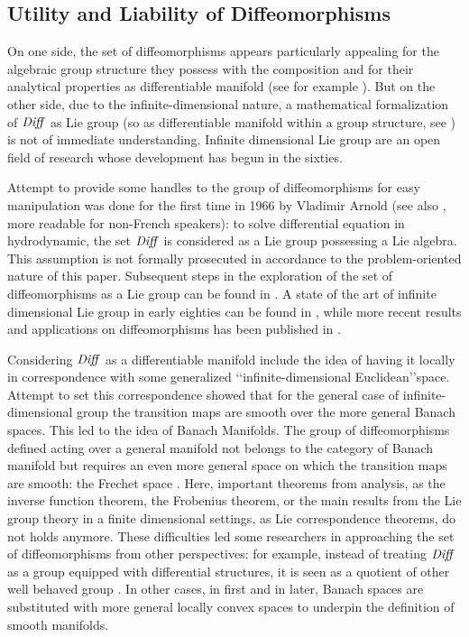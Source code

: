 \subsection{Utility and Liability of Diffeomorphisms}\label{se:diffe_util_and_liab}

On one side, the set of diffeomorphisms appears particularly appealing for the algebraic group structure they possess with the composition and for their analytical properties as differentiable manifold (see for example \cite{michor1980manifolds}). But on the other side, due to the infinite-dimensional nature, a mathematical formalization of $\text{\emph{Diff}}$ as Lie group (so as differentiable manifold within a group structure, see \cite{warner}) is not of immediate understanding. Infinite dimensional Lie group are an open field of research whose development has begun in the sixties.

Attempt to provide some handles to the group of diffeomorphisms for easy manipulation was done for the first time in 1966 by Vladimir Arnold \cite{arnold1966geometrie} (see also \cite{arnold1998topological}, more readable for non-French speakers): to solve differential equation in hydrodynamic, the set $\text{\emph{Diff}}$ is considered as a Lie group possessing a Lie algebra. This assumption is not formally prosecuted in accordance to the problem-oriented nature of this paper. Subsequent steps in the exploration of the set of diffeomorphisms as a Lie group can be found in \cite{marsden1970hamiltonian, ebin1970groups, omori1970group, michor1980manifolds, leslie1983lie}. A state of the art of  infinite dimensional Lie group in early eighties can be found in \cite{Milnor:84:remarks}, while more recent results and applications on diffeomorphisms has been published in \cite{ovsienko1992integrals, bauer2010sobolev, schmid2010infinite,  bauer2011geodesic}.

Considering $\text{\emph{Diff}}$ as a differentiable manifold include the idea of having it locally in correspondence with some generalized \lq\lq infinite-dimensional Euclidean\rq\rq\phantom{z}space. Attempt to set this correspondence showed that for the general case of infinite-dimensional group the transition maps are smooth over the more general Banach spaces. This led to the idea of Banach Manifolds. The group of diffeomorphisms defined acting over a general manifold not belongs to the category of Banach manifold but requires an even more general space on which the transition maps are smooth: the Frechet space \cite{khesin2008geometry}. Here, important theorems from analysis, as the inverse function theorem, the Frobenius theorem, or the main results from the Lie group theory in a finite dimensional settings, as Lie correspondence theorems, do not holds anymore. These difficulties led some researchers in approaching the set of diffeomorphisms from other perspectives: 
for example, instead of treating $\text{\emph{Diff}}$ as a group equipped with differential structures, it is seen as a quotient of other well behaved group \cite{wojtynski1994one}. In other cases, in \cite{marsden1970hamiltonian} first and in \cite{milnor1984remarks} later, Banach spaces are substituted with more general locally convex spaces to underpin the definition of smooth manifolds. 

